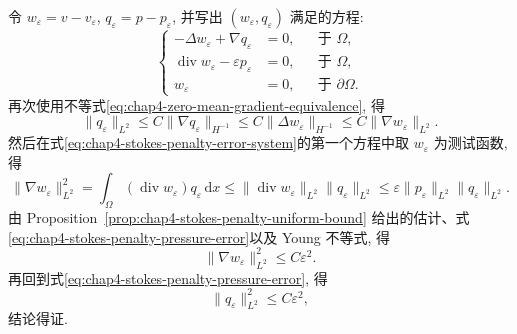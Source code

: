 \begin{Proof}
令 $w_\varepsilon=v-v_\varepsilon$, $q_\varepsilon=p-p_\varepsilon$, 并写出 $(w_\varepsilon,q_\varepsilon)$ 满足的方程:
\begin{equation}
 \left\{
 \begin{aligned}
  -\Delta w_\varepsilon+\nabla q_\varepsilon&=0,&&\text{于 }\Omega,\\
  \operatorname{div}w_\varepsilon-\varepsilon p_\varepsilon&=0,&&\text{于 }\Omega,\\
  w_\varepsilon&=0,&&\text{于 }\partial\Omega.
 \end{aligned}
 \right.
 \label{eq:chap4-stokes-penalty-error-system}
\end{equation}
再次使用不等式\eqref{eq:chap4-zero-mean-gradient-equivalence}, 得
\begin{equation}
 \|q_\varepsilon\|_{L^2}
 \leq C\|\nabla q_\varepsilon\|_{H^{-1}}
 \leq C\|\Delta w_\varepsilon\|_{H^{-1}}
 \leq C\|\nabla w_\varepsilon\|_{L^2}.
 \label{eq:chap4-stokes-penalty-pressure-error}
\end{equation}
然后在式\eqref{eq:chap4-stokes-penalty-error-system}的第一个方程中取 $w_\varepsilon$ 为测试函数, 得
\[
 \|\nabla w_\varepsilon\|_{L^2}^2
 =\int_\Omega(\operatorname{div}w_\varepsilon)q_\varepsilon\,\mathrm dx
 \leq\|\operatorname{div}w_\varepsilon\|_{L^2}\|q_\varepsilon\|_{L^2}
 \leq\varepsilon\|p_\varepsilon\|_{L^2}\|q_\varepsilon\|_{L^2}.
\]
由 Proposition~\ref{prop:chap4-stokes-penalty-uniform-bound} 给出的估计、式\eqref{eq:chap4-stokes-penalty-pressure-error}以及 Young 不等式, 得
\[
 \|\nabla w_\varepsilon\|_{L^2}^2\leq C\varepsilon^2.
\]
再回到式\eqref{eq:chap4-stokes-penalty-pressure-error}, 得
\[
 \|q_\varepsilon\|_{L^2}^2\leq C\varepsilon^2,
\]
结论得证.
\end{Proof}
